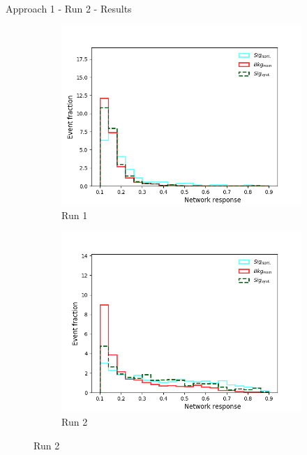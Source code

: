 \begin{frame}{Approach 1 - Run 2 - Results}
\vspace{-0.3cm}
    \begin{figure}[htbp]
    \centering
    \begin{subfigure}[b]{0.47\textwidth}
        \includegraphics[width=\textwidth]{app1/full_classic_syst.png}
        \caption{Run 1}
        \label{fig:simple:final:sepa}
    \end{subfigure}
\quad
    \begin{subfigure}[b]{0.47\textwidth}
        \includegraphics[width=\textwidth]{app1/half_classic_syst.png}
        \caption{Run 2}
        \label{fig:simple:final:syst}
    \end{subfigure}

\end{figure}
\end{frame}
